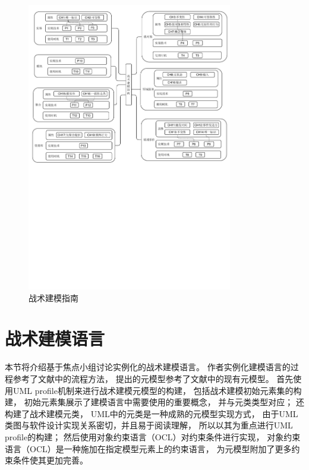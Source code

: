 \begin{figure}[!htbp] %
    \centering %
    \includegraphics[width=0.8\textwidth]{FIGs/chapter3/theoryFramework.pdf} %
    \caption{战术建模指南} %
    \label{theoryFramework} %
\end{figure}%

\section{战术建模语言}


本节将介绍基于焦点小组讨论实例化的战术建模语言。
作者实例化建模语言的过程参考了\cite{giachetti2009integration,giachetti2009using}文献中的流程方法，
提出的元模型参考了\cite{hippchen2019systematic,le2018domain,rademacher2017towards}文献中的现有元模型。
首先使用UML profile机制来进行战术建模元模型的构建，
包括战术建模初始元素集的构建，
初始元素集展示了建模语言中需要使用的重要概念，
并与元类类型对应；
还构建了战术建模元类，
UML中的元类是一种成熟的元模型实现方式，
由于UML类图与软件设计实现关系密切，并且易于阅读理解，
所以以其为重点进行UML profile的构建；
然后使用对象约束语言（OCL）对约束条件进行实现，
对象约束语言（OCL）是一种施加在指定模型元素上的约束语言，
为元模型附加了更多约束条件使其更加完善。


